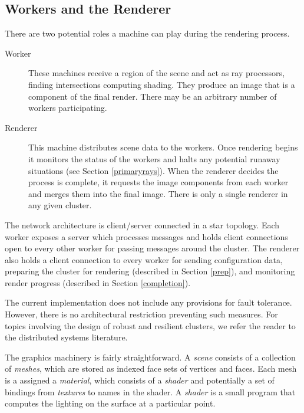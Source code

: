 \documentclass[a4paper,twoside]{article}
\begin{document}
\subsection{Workers and the Renderer}
\label{workers}

There are two potential roles a machine can play during the rendering process.

\begin{description}
    \item[Worker] These machines receive a region of the scene and act as ray
        processors, finding intersections computing shading. They produce an
        image that is a component of the final render. There may be an
        arbitrary number of workers participating.
    \item[Renderer] This machine distributes scene data to the workers. Once
        rendering begins it monitors the status of the workers and halts any
        potential runaway situations (see Section \ref{primaryrays}). When the
        renderer decides the process is complete, it requests the image
        components from each worker and merges them into the final image.
        There is only a single renderer in any given cluster.
\end{description}

The network architecture is client/server connected in a star topology. Each
worker exposes a server which processes messages and holds client connections
open to every other worker for passing messages around the cluster. The renderer
also holds a client connection to every worker for sending configuration data,
preparing the cluster for rendering (described in Section \ref{prep}), and
monitoring render progress (described in Section \ref{completion}).

The current implementation does not include any provisions for fault tolerance.
However, there is no architectural restriction preventing such measures. For
topics involving the design of robust and resilient clusters, we refer the
reader to the distributed systems literature.

The graphics machinery is fairly straightforward. A \emph{scene} consists of a
collection of \emph{meshes}, which are stored as indexed face sets of vertices
and faces. Each mesh is a assigned a \emph{material}, which consists of a
\emph{shader} and potentially a set of bindings from \emph{textures} to names
in the shader. A \emph{shader} is a small program that computes the lighting on
the surface at a particular point.
\end{document}
